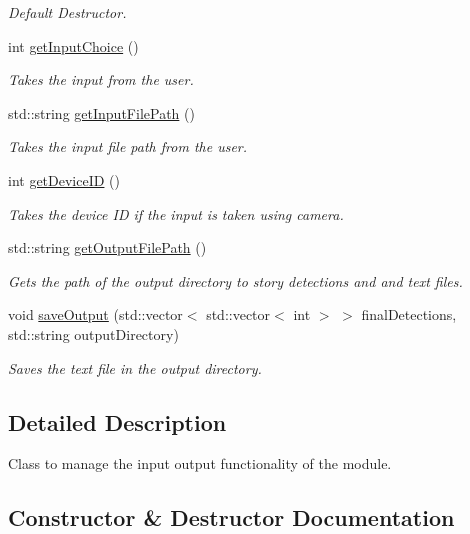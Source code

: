 \begin{DoxyCompactItemize}
\begin{DoxyCompactList}\small\item\em Default Destructor. \end{DoxyCompactList}\item 
int \hyperlink{classIOHandler_a3f67a9ba2c496895443cd12af0786749}{get\+Input\+Choice} ()
\begin{DoxyCompactList}\small\item\em Takes the input from the user. \end{DoxyCompactList}\item 
std\+::string \hyperlink{classIOHandler_a0cd2ab4b1fea5696e63e626b0ade9182}{get\+Input\+File\+Path} ()
\begin{DoxyCompactList}\small\item\em Takes the input file path from the user. \end{DoxyCompactList}\item 
int \hyperlink{classIOHandler_ab032ccce83ab9fdd990dd163bc791f57}{get\+Device\+ID} ()
\begin{DoxyCompactList}\small\item\em Takes the device ID if the input is taken using camera. \end{DoxyCompactList}\item 
std\+::string \hyperlink{classIOHandler_a2bc83b86cbec3a5bea71d28e7abaa58e}{get\+Output\+File\+Path} ()
\begin{DoxyCompactList}\small\item\em Gets the path of the output directory to story detections and and text files. \end{DoxyCompactList}\item 
void \hyperlink{classIOHandler_a86d53a227457528275b8ab3bd653654f}{save\+Output} (std\+::vector$<$ std\+::vector$<$ int $>$ $>$ final\+Detections, std\+::string output\+Directory)
\begin{DoxyCompactList}\small\item\em Saves the text file in the output directory. \end{DoxyCompactList}\end{DoxyCompactItemize}


\subsection{Detailed Description}
Class to manage the input output functionality of the module. 

\subsection{Constructor \& Destructor Documentation}
